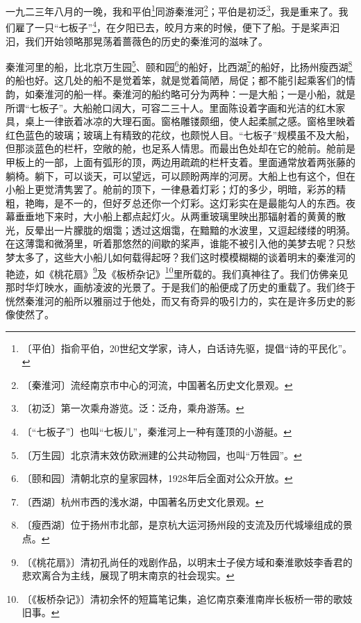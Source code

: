 \documentclass[12pt,UTF-8,openany]{ctexbook}
\begin{document}
\begin{normalsize}
    
    一九二三年八月的一晚，我和平伯\footnote{〔平伯〕指俞平伯，20世纪文学家，诗人，白话诗先驱，提倡“诗的平民化”。}同游秦淮河\footnote{〔秦淮河〕流经南京市中心的河流，中国著名历史文化景观。}；平伯是初泛\footnote{〔初泛〕第一次乘舟游览。泛：泛舟，乘舟游荡。}，我是重来了。我们雇了一只“七板子”\footnote{〔“七板子”〕也叫“七板儿”，秦淮河上一种有蓬顶的小游艇。}，在夕阳已去，皎月方来的时候，便下了船。于是桨声汩汩，我们开始领略那晃荡着蔷薇色的历史的秦淮河的滋味了。
    
    秦淮河里的船，比北京万生园\footnote{〔万生园〕北京清末效仿欧洲建的公共动物园，也叫“万牲园”。}、颐和园\footnote{〔颐和园〕清朝北京的皇家园林，1928年后全面对公众开放。}的船好，比西湖\footnote{〔西湖〕杭州市西的浅水湖，中国著名历史文化景观。}的船好，比扬州瘦西湖\footnote{〔瘦西湖〕位于扬州市北部，是京杭大运河扬州段的支流及历代城壕组成的景点。}的船也好。这几处的船不是觉着笨，就是觉着简陋，局促；都不能引起乘客们的情韵，如秦淮河的船一样。秦淮河的船约略可分为两种：一是大船；一是小船，就是所谓“七板子”。大船舱口阔大，可容二三十人。里面陈设着字画和光洁的红木家具，桌上一律嵌着冰凉的大理石面。窗格雕镂颇细，使人起柔腻之感。窗格里映着红色蓝色的玻璃；玻璃上有精致的花纹，也颇悦人目。“七板子”规模虽不及大船，但那淡蓝色的栏杆，空敞的舱，也足系人情思。而最出色处却在它的舱前。舱前是甲板上的一部，上面有弧形的顶，两边用疏疏的栏杆支着。里面通常放着两张藤的躺椅。躺下，可以谈天，可以望远，可以顾盼两岸的河房。大船上也有这个，但在小船上更觉清隽罢了。舱前的顶下，一律悬着灯彩；灯的多少，明暗，彩苏的精粗，艳晦，是不一的，但好歹总还你一个灯彩。这灯彩实在是最能勾人的东西。夜幕垂垂地下来时，大小船上都点起灯火。从两重玻璃里映出那辐射着的黄黄的散光，反晕出一片朦胧的烟霭；透过这烟霭，在黯黯的水波里，又逗起缕缕的明漪。在这薄霭和微漪里，听着那悠然的间歇的桨声，谁能不被引入他的美梦去呢？只愁梦太多了，这些大小船儿如何载得起呀？我们这时模模糊糊的谈着明末的秦淮河的艳迹，如《桃花扇》\footnote{〔《桃花扇》〕清初孔尚任的戏剧作品，以明末士子侯方域和秦淮歌妓李香君的悲欢离合为主线，展现了明末南京的社会现实。}及《板桥杂记》\footnote{〔《板桥杂记》〕清初余怀的短篇笔记集，追忆南京秦淮南岸长板桥一带的歌妓旧事。}里所载的。我们真神往了。我们仿佛亲见那时华灯映水，画舫凌波的光景了。于是我们的船便成了历史的重载了。我们终于恍然秦淮河的船所以雅丽过于他处，而又有奇异的吸引力的，实在是许多历史的影像使然了。
    

\end{normalsize}
\end{document}
